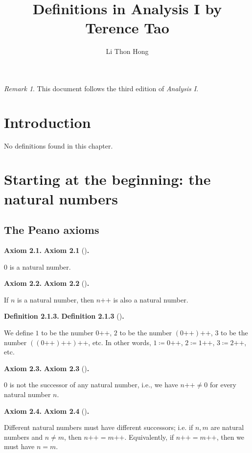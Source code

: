 \documentclass[12pt]{article}
\title{Definitions in Analysis I by Terence Tao}
\author{Li Thon Hong}
\date{}
\newcommand{\succr}[1]{#1 \textrm{++}}
\newenvironment{df}[2][\relax]{
\vspace{4mm}
    \noindent\setlength{\parskip}{1em}%
    \ifx#1\relax%
        \textbf{#2. }%
    \else%
        \textbf{#2} (#1)\textbf{. }%
    \fi%
    \ignorespaces%
}{}
\theoremstyle{remark}
\newtheorem*{remark}{Remark}
\begin{document}
\maketitle
\tableofcontents
\vspace{5mm}
\begin{remark}
    This document follows the third edition of \textit{Analysis I}.
\end{remark}

\pagebreak


\section{Introduction}
No definitions found in this chapter.

\pagebreak


\section{Starting at the beginning: the natural numbers}
\subsection{The Peano axioms}

\begin{df}{Axiom 2.1}
    $0$ is a natural number.
\end{df}


\begin{df}{Axiom 2.2}
    If $n$ is a natural number, then $\succr{n}$ is also a natural number.
\end{df}


\begin{df}{Definition 2.1.3}
    We define $1$ to be the number $\succr{0}$, $2$ to be the number $\succr{(\succr{0})}$, 3 to be the number $\succr{(\succr{(\succr{0})})}$, etc.
    In other words, $1 \coloneqq \succr{0}$, $2 \coloneqq \succr{1}$, $3 \coloneqq \succr{2}$, etc.
\end{df}


\begin{df}{Axiom 2.3}
    $0$ is not the successor of any natural number, i.e., we have $\succr{n} \ne 0$ for every natural number $n$.
\end{df}


\begin{df}{Axiom 2.4}
    Different natural numbers must have different successors; i.e. if $n, m$ are natural numbers and $n \ne m$, then $\succr{n} = \succr{m}$.
    Equivalently, if $\succr{n} = \succr{m}$, then we must have $n = m$.    
\end{df}
\end{document}
